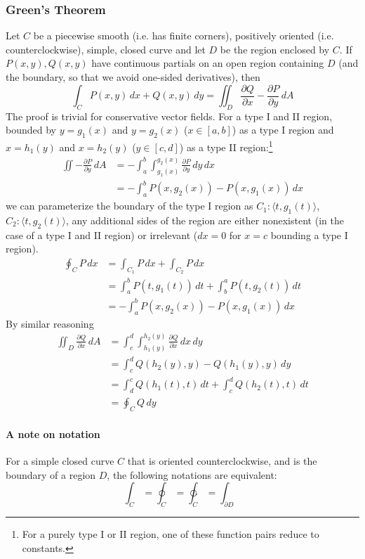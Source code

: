 \documentclass{article}
\begin{document}
\subsubsection{Green's Theorem}
Let $C$ be a piecewise smooth (i.e. has finite corners), positively oriented (i.e. counterclockwise), simple, closed curve  and let $D$ be the region enclosed by $C$. If $P(x,y),Q(x,y)$ have continuous partials on an open region containing $D$ (and the boundary, so that we avoid one-sided derivatives), then
$$\int_C P(x,y)\,dx+Q(x,y)\,dy=\iint_D\frac{\partial Q}{\partial x} - \frac{\partial P}{\partial y}\,dA$$
The proof is trivial for conservative vector fields. For a type I and II region, bounded by $y=g_1(x)$ and $y=g_2(x)$ ($x\in[a,b]$) as a type I region and $x=h_1(y)$ and $x=h_2(y)$ ($y\in[c,d]$) as a type II region:\footnote{For a purely type I or II region, one of these function pairs reduce to constants.}
\begin{align*}
    \iint -\frac{\partial P}{\partial y}\,dA &= -\int_a^b\int_{g_1(x)}^{g_2(x)}\frac{\partial P}{\partial y}\,dy\,dx\\
    &=-\int_a^bP(x,g_2(x))-P(x,g_1(x))\,dx
\end{align*}
we can parameterize the boundary of the type I region as $C_1:\langle t, g_1(t)\rangle$, $C_2:\langle t, g_2(t)\rangle$, any additional sides of the region are either nonexistent (in the case of a type I and II region) or irrelevant ($dx=0$ for $x=c$ bounding a type I region).
\begin{align*}
    \oint_CP\,dx &= \int_{C_1}P\,dx + \int_{C_2}P\,dx\\
    &=\int_a^bP(t,g_1(t))\,dt+\int_b^aP(t,g_2(t))\,dt\\
    &=-\int_a^bP(x,g_2(x))-P(x,g_1(x))\,dx
\end{align*}
By similar reasoning
\begin{align*}
    \iint_D\frac{\partial Q}{\partial x}\,dA &= \int_c^d\int_{h_1(y)}^{h_2(y)}\frac{\partial Q}{\partial x}\,dx\,dy\\
    &= \int_c^dQ(h_2(y),y)-Q(h_1(y),y)\,dy\\
    &= \int_d^cQ(h_1(t),t)\,dt+\int_c^dQ(h_2(t),t)\,dt\\
    &=\oint_CQ\,dy
\end{align*}

\paragraph{A note on notation}
For a simple closed curve $C$ that is oriented counterclockwise, and is the boundary of a region $D$, the following notations are equivalent:
$$\int_C=\oint_C=\ointctrclockwise_C=\int_{\partial D}$$
\end{document}
